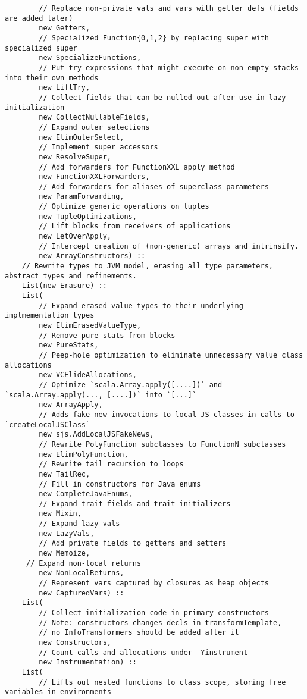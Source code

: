 \documentclass[letterpaper,12pt,titlepage,oneside,final]{book}
\begin{document}
\begin{verbatim}
		// Replace non-private vals and vars with getter defs (fields are added later)    
		new Getters,
		// Specialized Function{0,1,2} by replacing super with specialized super                
		new SpecializeFunctions,  
		// Put try expressions that might execute on non-empty stacks into their own methods  
		new LiftTry, 
		// Collect fields that can be nulled out after use in lazy initialization               
		new CollectNullableFields,  
		// Expand outer selections
		new ElimOuterSelect,
		// Implement super accessors        
		new ResolveSuper,           
		// Add forwarders for FunctionXXL apply method
		new FunctionXXLForwarders,  
		// Add forwarders for aliases of superclass parameters
		new ParamForwarding,     
		// Optimize generic operations on tuples   
		new TupleOptimizations,   
		// Lift blocks from receivers of applications  
		new LetOverApply, 
		// Intercept creation of (non-generic) arrays and intrinsify.          
		new ArrayConstructors) ::  
	// Rewrite types to JVM model, erasing all type parameters, abstract types and refinements.	 
	List(new Erasure) ::            
	List(
		// Expand erased value types to their underlying implmementation types
		new ElimErasedValueType,    
		// Remove pure stats from blocks
		new PureStats,        
		// Peep-hole optimization to eliminate unnecessary value class allocations      
		new VCElideAllocations,   
		// Optimize `scala.Array.apply([....])` and `scala.Array.apply(..., [....])` into `[...]`  
		new ArrayApply,     
		// Adds fake new invocations to local JS classes in calls to `createLocalJSClass`        
		new sjs.AddLocalJSFakeNews, 
	 	// Rewrite PolyFunction subclasses to FunctionN subclasses
		new ElimPolyFunction,     
	 	// Rewrite tail recursion to loops 
		new TailRec,               
		// Fill in constructors for Java enums
		new CompleteJavaEnums,    
		// Expand trait fields and trait initializers  
		new Mixin,                  
		// Expand lazy vals
		new LazyVals,              
		// Add private fields to getters and setters
		new Memoize,                
	 // Expand non-local returns
		new NonLocalReturns,       
		// Represent vars captured by closures as heap objects
		new CapturedVars) ::        
	List(
		// Collect initialization code in primary constructors
		// Note: constructors changes decls in transformTemplate, 
		// no InfoTransformers should be added after it
		new Constructors,           
		// Count calls and allocations under -Yinstrument
		new Instrumentation) ::     
	List(
		// Lifts out nested functions to class scope, storing free variables in environments

\end{verbatim}
\end{document}
